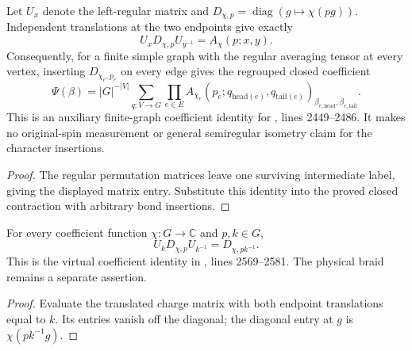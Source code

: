 \begin{lemma}
    \label{thm:peps_regular_charge_bond_contraction}
    \leanok
    Let $U_x$ denote the left-regular matrix and
    $D_{\chi,p}=\operatorname{diag}(g\mapsto\chi(pg))$.
    Independent translations at the two endpoints give exactly
    \[
        U_xD_{\chi,p}U_{y^{-1}}=A_\chi(p;x,y).
    \]
    Consequently, for a finite simple graph with the regular averaging
    tensor at every vertex, inserting $D_{\chi_e,p_e}$ on every edge
    gives the regrouped closed coefficient
    \[
        \Psi(\beta)
        =|G|^{-|V|}\sum_{q:V\to G}
        \prod_{e\in E}
        A_{\chi_e}(p_e;q_{\mathrm{head}(e)},q_{\mathrm{tail}(e)})
        _{\beta_{e,\mathrm{head}},\beta_{e,\mathrm{tail}}}.
    \]
    This is an auxiliary finite-graph coefficient identity for
    \cite[charge definition and detection]{Schuch2010PEPS}, lines 2449--2486.
    It makes no original-spin measurement or general semiregular
    isometry claim for the character insertions.
\end{lemma}
\begin{proof}\leanok
    The regular permutation matrices leave one surviving intermediate label,
    giving the displayed matrix entry. Substitute this identity into the
    proved closed contraction with arbitrary bond insertions.
\end{proof}

\begin{lemma}
    \label{thm:peps_regular_charge_flux_conjugation}
    \leanok
    For every coefficient function $\chi:G\to\mathbb C$ and $p,k\in G$,
    \[
        U_kD_{\chi,p}U_{k^{-1}}=D_{\chi,pk^{-1}}.
    \]
    This is the virtual coefficient identity in
    \cite[braiding of charges with fluxes]{Schuch2010PEPS}, lines 2569--2581.
    The physical braid remains a separate assertion.
\end{lemma}
\begin{proof}\leanok
    Evaluate the translated charge matrix with both endpoint translations
    equal to $k$. Its entries vanish off the diagonal; the diagonal entry
    at $g$ is $\chi(pk^{-1}g)$.
\end{proof}
